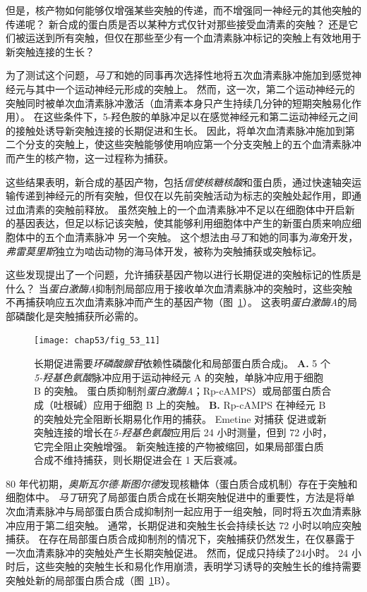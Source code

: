 但是，核产物如何能够仅增强某些突触的传递，而不增强同一神经元的其他突触的传递呢？
新合成的蛋白质是否以某种方式仅针对那些接受血清素的突触？
还是它们被运送到所有突触，但仅在那些至少有一个血清素脉冲标记的突触上有效地用于新突触连接的生长？


为了测试这个问题，\textit{马丁}和她的同事再次选择性地将五次血清素脉冲施加到感觉神经元与其中一个运动神经元形成的突触上。
然而，这一次，第二个运动神经元的突触同时被单次血清素脉冲激活（血清素本身只产生持续几分钟的短期突触易化作用）。
在这些条件下，5-羟色胺的单脉冲足以在感觉神经元和第二运动神经元之间的接触处诱导新突触连接的长期促进和生长。
因此，将单次血清素脉冲施加到第二个分支的突触上，使这些突触能够使用响应第一个分支突触上的五个血清素脉冲而产生的核产物，这一过程称为捕获。


这些结果表明，新合成的基因产物，包括\textit{信使核糖核酸}和蛋白质，通过快速轴突运输传递到神经元的所有突触，但仅在以先前突触活动为标志的突触处起作用，即通过血清素的突触前释放。
虽然突触上的一个血清素脉冲不足以在细胞体中开启新的基因表达，但足以标记该突触，使其能够利用细胞体中产生的新蛋白质来响应细胞体中的五个血清素脉冲 另一个突触。
这个想法由\textit{马丁}和她的同事为\textit{海兔}开发，\textit{弗雷}\textit{莫里斯}独立为啮齿动物的海马体开发，被称为突触捕获或突触标记。


这些发现提出了一个问题，允许捕获基因产物以进行长期促进的突触标记的性质是什么？
当\textit{蛋白激酶A}抑制剂局部应用于接收单次血清素脉冲的突触时，这些突触不再捕获响应五次血清素脉冲而产生的基因产物（图~\ref{fig:53_11}）。
这表明\textit{蛋白激酶A}的局部磷酸化是突触捕获所必需的。


\begin{figure}[htbp]
	\centering
	\texttt{[image: chap53/fig\_53\_11]}
	\caption{长期促进需要\textit{环磷酸腺苷}依赖性磷酸化和局部蛋白质合成j\cite{casadio1999transient}。
		\textbf{A.} 5 个\textit{5-羟基色氨酸}脉冲应用于运动神经元 A 的突触，单脉冲应用于细胞 B 的突触。
		蛋白质抑制剂\textit{蛋白激酶A}；Rp-cAMPS）或局部蛋白质合成（吐根碱）应用于细胞 B 上的突触。
		\textbf{B.} Rp-cAMPS 在神经元 B 的突触处完全阻断长期易化作用的捕获。
		Emetine 对捕获 促进或新突触连接的增长在\textit{5-羟基色氨酸}应用后 24 小时测量，但到 72 小时，它完全阻止突触增强。
		新突触连接的产物被缩回，如果局部蛋白质合成不维持捕获，则长期促进会在 1 天后衰减。}
	\label{fig:53_11}
\end{figure}


80 年代初期，\textit{奥斯瓦尔德$\cdot$斯图尔德}发现核糖体（蛋白质合成机制）存在于突触和细胞体中。
\textit{马丁}研究了局部蛋白质合成在长期突触促进中的重要性，方法是将单次血清素脉冲与局部蛋白质合成抑制剂一起应用于一组突触，同时将五次血清素脉冲应用于第二组突触。
通常，长期促进和突触生长会持续长达 72 小时以响应突触捕获。
在存在局部蛋白质合成抑制剂的情况下，突触捕获仍然发生，在仅暴露于一次血清素脉冲的突触处产生长期突触促进。
然而，促成只持续了24小时。
24 小时后，这些突触的突触生长和易化作用崩溃，表明学习诱导的突触生长的维持需要突触处新的局部蛋白质合成（图~\ref{fig:53_11}B）。


